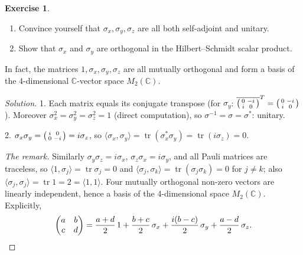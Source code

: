 \documentclass[11pt,a4paper]{article}
\numberwithin{equation}{section}
\newcommand{\C}{\mathbb{C}}
\newcommand{\ip}[2]{\langle #1, #2\rangle}
\newcommand{\conj}[1]{\overline{#1}}
\DeclareMathOperator{\tr}{tr}
\theoremstyle{plain}
\theoremstyle{definition}
\newtheorem{exercise}[theorem]{Exercise}
\theoremstyle{plain}
\theoremstyle{definition}
\newenvironment{solution}{\begin{proof}[Solution]}{\end{proof}}
\begin{document}
\begin{exercise}
\begin{enumerate}
\item Convince yourself that $\sigma_x,\sigma_y,\sigma_z$ are all both self-adjoint and unitary.
\item Show that $\sigma_x$ and $\sigma_y$ are orthogonal in the Hilbert--Schmidt scalar product.
\end{enumerate}
In fact, the matrices $1,\sigma_x,\sigma_y,\sigma_z$ are all mutually orthogonal and form
a basis of the $4$-dimensional $\C$-vector space $M_2(\C)$.
\end{exercise}
\begin{solution}
1. Each matrix equals its conjugate transpose (for $\sigma_y$:
$\conj{\begin{psmallmatrix}0&-i\\i&0\end{psmallmatrix}}^{T}=\begin{psmallmatrix}0&-i\\i&0\end{psmallmatrix}$).
Moreover $\sigma_x^2=\sigma_y^2=\sigma_z^2=1$ (direct computation), so
$\sigma^{-1}=\sigma=\sigma^*$: unitary.

2. $\sigma_x\sigma_y=\begin{psmallmatrix}i&0\\0&-i\end{psmallmatrix}=i\sigma_z$, so
$\ip{\sigma_x}{\sigma_y}=\tr(\sigma_x^*\sigma_y)=\tr(i\sigma_z)=0$.

\emph{The remark.} Similarly $\sigma_y\sigma_z=i\sigma_x$, $\sigma_z\sigma_x=i\sigma_y$,
and all Pauli matrices are traceless, so $\ip{1}{\sigma_j}=\tr\sigma_j=0$ and
$\ip{\sigma_j}{\sigma_k}=\tr(\sigma_j\sigma_k)=0$ for $j\ne k$; also
$\ip{\sigma_j}{\sigma_j}=\tr1=2=\ip11$. Four mutually orthogonal non-zero vectors are
linearly independent, hence a basis of the 4-dimensional space $M_2(\C)$. Explicitly,
\[
\begin{pmatrix}a&b\\c&d\end{pmatrix}=\frac{a+d}2\,1+\frac{b+c}2\,\sigma_x+\frac{i(b-c)}2\,\sigma_y+\frac{a-d}2\,\sigma_z .\qedhere
\]
\end{solution}
\end{document}
